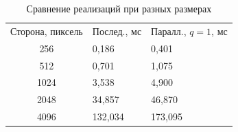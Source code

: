 \begin{table}[H]\caption{Сравнение реализаций при разных размерах}\label{tab:sizes}
\centering\begin{tabularx}{\textwidth}{|c|X|X|}\hline
Сторона, пиксель & Послед., мс & Паралл., $q=1$, мс\\\hhline{|=:=:=|}
256 & 0,186 & 0,401 \\\hline
512 & 0,701 & 1,075 \\\hline
1024 & 3,538 & 4,900 \\\hline
2048 & 34,857 & 46,870 \\\hline
4096 & 132,034 & 173,095 \\\hline
\end{tabularx}\end{table}